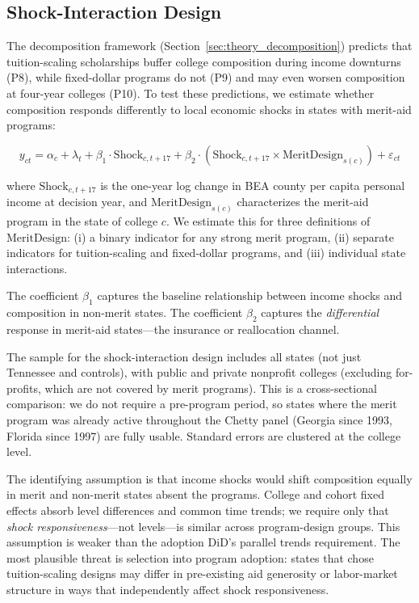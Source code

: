 \subsection{Shock-Interaction Design}
\label{sec:empirical_shock}

The decomposition framework (Section~\ref{sec:theory_decomposition})
predicts that tuition-scaling scholarships buffer college composition
during income downturns (P8), while fixed-dollar programs do not (P9)
and may even worsen composition at four-year colleges (P10). To test
these predictions, we estimate whether composition responds
differently to local economic shocks in states with merit-aid
programs:

\begin{equation}
y_{ct} = \alpha_c + \lambda_t + \beta_1 \cdot \text{Shock}_{c,t+17}
+ \beta_2 \cdot (\text{Shock}_{c,t+17} \times
\text{MeritDesign}_{s(c)}) + \varepsilon_{ct}
\label{eq:shock}
\end{equation}

\noindent where $\text{Shock}_{c,t+17}$ is the one-year log change in
BEA county per capita personal income at decision year, and
$\text{MeritDesign}_{s(c)}$ characterizes the merit-aid program in the
state of college $c$. We estimate this for three definitions of
$\text{MeritDesign}$: (i) a binary indicator for any strong merit
program, (ii) separate indicators for tuition-scaling and fixed-dollar
programs, and (iii) individual state interactions.

The coefficient $\beta_1$ captures the baseline relationship between
income shocks and composition in non-merit states. The coefficient
$\beta_2$ captures the \emph{differential} response in merit-aid
states---the insurance or reallocation channel.

The sample for the shock-interaction design includes all states (not
just Tennessee and controls), with public and private nonprofit colleges
(excluding for-profits, which are not covered by merit programs). This
is a cross-sectional comparison: we do not require a pre-program
period, so states where the merit program was already active throughout
the Chetty panel (Georgia since 1993, Florida since 1997) are fully
usable. Standard errors are clustered at the college level.

The identifying assumption is that income shocks would shift
composition equally in merit and non-merit states absent the programs.
College and cohort fixed effects absorb level differences and common
time trends; we require only that \emph{shock responsiveness}---not
levels---is similar across program-design groups. This assumption is
weaker than the adoption DiD's parallel trends requirement. The most
plausible threat is selection into program adoption: states that chose
tuition-scaling designs may differ in pre-existing aid generosity or
labor-market structure in ways that independently affect shock
responsiveness.

